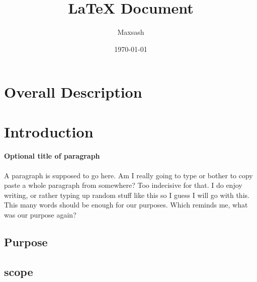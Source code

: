 \documentclass{article}
\title{LaTeX Document}
\author{Maxsash}
\date{\today}
\begin{document}
	\maketitle

	\section{Overall Description}
	
	\section{Introduction}
	\paragraph{Optional title of paragraph}
	A paragraph is supposed to go here. Am I really going to type or bother to copy paste a whole paragraph from somewhere? Too indecisive for that. I do enjoy writing, or rather typing up random stuff like this so I guess I will go with this. This many words should be enough for our purposes. Which reminds me, what was our purpose again?

	\subsection{Purpose}

	\subsection{scope}
\end{document}
